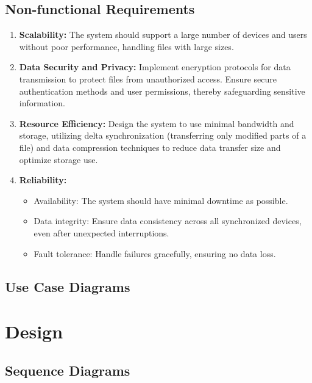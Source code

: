\documentclass{article}
\begin{document}
                \subsection{Non-functional Requirements}
                    \begin{enumerate}
                        \item \textbf{Scalability:} The system should support a large number of devices and users without poor performance, handling files with large sizes.
                        \item \textbf{Data Security and Privacy:}  Implement encryption protocols for data transmission to protect files from unauthorized access. Ensure secure authentication methods and user permissions, thereby safeguarding sensitive information.
                        \item \textbf{Resource Efficiency:} Design the system to use minimal bandwidth and storage, utilizing delta synchronization (transferring only modified parts of a file) and data compression techniques to reduce data transfer size and optimize storage use.
                        \item \textbf{Reliability: }
                        \begin{itemize}
                            \item Availability: The system should have minimal downtime as possible.
                            \item Data integrity: Ensure data consistency across all synchronized devices, even after unexpected interruptions.
                            \item Fault tolerance: Handle failures gracefully, ensuring no data loss.
                        \end{itemize}
                    \end{enumerate}
                \subsection{Use Case Diagrams}

        \section{Design}
                \subsection{Sequence Diagrams}
\end{document}
